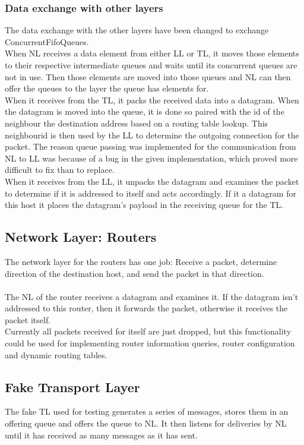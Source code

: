 \subsubsection{Data exchange with other layers}
The data exchange with the other layers have been changed to exchange ConcurrentFifoQueues.\\
When NL receives a data element from either LL or TL, it moves those elements to their respective intermediate queues and waits until its concurrent queues are not in use. Then those elements are moved into those queues and NL can then offer the queues to the layer the queue has elements for.\\
When it receives from the TL, it packs the received data into a datagram. When the datagram is moved into the queue, it is done so paired with the id of the neighbour the destination address based on a routing table lookup. This neighbourid is then used by the LL to determine the outgoing connection for the packet. The reason queue passing was implemented for the communication from NL to LL was because of a bug in the given implementation, which proved more difficult to fix than to replace.\\
When it receives from the LL, it unpacks the datagram and examines the packet to determine if it is addressed to itself and acts accordingly. If it a datagram for this host it places the datagram's payload in the receiving queue for the TL.\\
\subsection{Network Layer: Routers}
\label{sec:NLRouters}
The network layer for the routers has one job: Receive a packet, determine direction of the destination host, and send the packet in that direction.\\
\\
The NL of the router receives a datagram and examines it. If the datagram isn't addressed to this router, then it forwards the packet, otherwise it receives the packet itself.\\
Currently all packets received for itself are just dropped, but this functionality could be used for implementing router information queries, router configuration and dynamic routing tables.

\subsection{Fake Transport Layer}
The fake TL used for testing generates a series of messages, stores them in an offering queue and offers the queue to NL. It then listens for deliveries by NL until it has received as many messages as it has sent.

